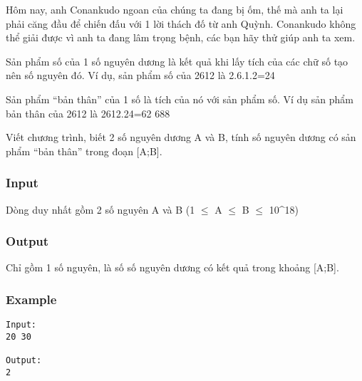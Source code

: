 



   Hôm nay, anh Conankudo ngoan của chúng ta đang bị ốm, thế mà anh ta lại phải căng đầu để chiến đấu với 1 lời thách đố từ anh Quỳnh. Conankudo không thể giải được vì anh ta đang lâm trọng bệnh, các bạn hãy thử giúp anh ta xem.  

   Sản phẩm số của 1 số nguyên dương là kết quả khi lấy tích của các chữ số tạo nên số nguyên đó. Ví dụ, sản phẩm số của 2612 là 2.6.1.2=24  

   Sản phẩm “bản thân” của 1 số      là tích của nó với sản phẩm số. Ví dụ sản phẩm bản thân của 2612 là 2612.24=62 688  

   Viết chương trình, biết 2 số nguyên dương A và B, tính số nguyên dương có sản phẩm “bản thân” trong đoạn [A;B].  

\subsubsection{   Input  }

   Dòng duy nhất gồm 2 số nguyên A và B (1 $\le$ A $\le$ B $\le$ 10^18)  

\subsubsection{   Output  }

   Chỉ gồm 1 số nguyên, là số số nguyên dương có kết quả trong khoảng [A;B].  

\subsubsection{   Example  }
\begin{verbatim}
Input:
20 30

Output:
2
\end{verbatim}
